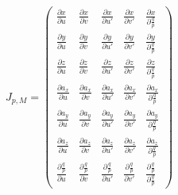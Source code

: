 \documentclass{article}
\begin{document}
$J_{p,M}=\left(\begin{array}{ccccc}\frac{\partial x}{\partial u} & \frac{\partial x}{\partial v} & \frac{\partial x}{\partial u\prime} & \frac{\partial x}{\partial v\prime} & \frac{\partial x}{\partial\frac{q}{p}}\\\frac{\partial y}{\partial u} & \frac{\partial y}{\partial v} & \frac{\partial y}{\partial u\prime} & \frac{\partial y}{\partial v\prime} & \frac{\partial y}{\partial\frac{q}{p}}\\\frac{\partial z}{\partial u} & \frac{\partial z}{\partial v} & \frac{\partial z}{\partial u\prime} & \frac{\partial z}{\partial v\prime} & \frac{\partial z}{\partial\frac{q}{p}}\\\frac{\partial a_{x}}{\partial u} & \frac{\partial a_{x}}{\partial v} & \frac{\partial a_{x}}{\partial u\prime} & \frac{\partial a_{x}}{\partial v\prime} & \frac{\partial a_{x}}{\partial\frac{q}{p}}\\\frac{\partial a_{y}}{\partial u} & \frac{\partial a_{y}}{\partial v} & \frac{\partial a_{y}}{\partial u\prime} & \frac{\partial a_{y}}{\partial v\prime} & \frac{\partial a_{y}}{\partial\frac{q}{p}}\\\frac{\partial a_{z}}{\partial u} & \frac{\partial a_{z}}{\partial v} & \frac{\partial a_{z}}{\partial u\prime} & \frac{\partial a_{z}}{\partial v\prime} & \frac{\partial a_{z}}{\partial\frac{q}{p}}\\\frac{\partial\frac{q}{p}}{\partial u} & \frac{\partial\frac{q}{p}}{\partial v} & \frac{\partial\frac{q}{p}}{\partial u\prime} & \frac{\partial\frac{q}{p}}{\partial v\prime} & \frac{\partial\frac{q}{p}}{\partial\frac{q}{p}}\end{array}\right)$
\pagebreak
\end{document}
